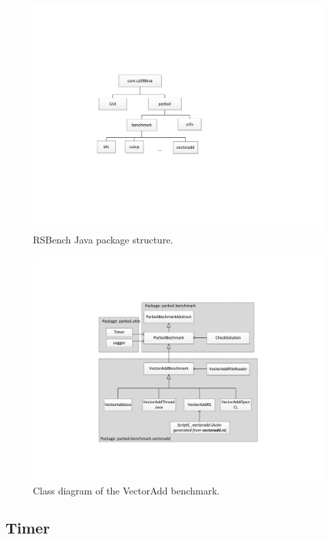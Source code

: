 \begin{figure}[t!]
\includegraphics[scale=0.65]{figs/package_diagram.pdf}
\caption{RSBench Java package structure.}
\label{fig:package_structure}
\centering
\end{figure}


\begin{figure}[t!]
\includegraphics[scale=0.5]{figs/vectoradd_class_diagram.pdf}
\caption{Class diagram of the VectorAdd benchmark.}
\label{fig:class_diagram}
\centering
\end{figure}

\subsection*{Timer}



